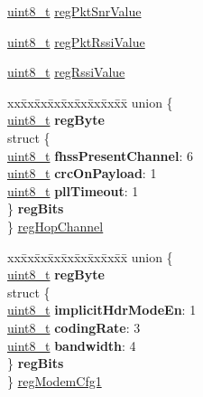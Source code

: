 \begin{DoxyCompactItemize}
\begin{tabbing}
\end{tabbing}\item 
\hyperlink{vl53l0x__types_8h_aba7bc1797add20fe3efdf37ced1182c5}{uint8\+\_\+t} \hyperlink{structFSK__Register__Map_a92cd6ce02538704e0e27d117099e4775}{reg\+Pkt\+Snr\+Value}
\item 
\hyperlink{vl53l0x__types_8h_aba7bc1797add20fe3efdf37ced1182c5}{uint8\+\_\+t} \hyperlink{structFSK__Register__Map_a019593bb7007a2b7d67e5565d565c5f8}{reg\+Pkt\+Rssi\+Value}
\item 
\hyperlink{vl53l0x__types_8h_aba7bc1797add20fe3efdf37ced1182c5}{uint8\+\_\+t} \hyperlink{structFSK__Register__Map_af6af2ecacf804bbab3b46c3f52a13b3f}{reg\+Rssi\+Value}
\item 
\begin{tabbing}
xx\=xx\=xx\=xx\=xx\=xx\=xx\=xx\=xx\=\kill
union \{\\
\>\hyperlink{vl53l0x__types_8h_aba7bc1797add20fe3efdf37ced1182c5}{uint8\_t} {\bfseries regByte}\\
\>struct \{\\
\>\>\hyperlink{vl53l0x__types_8h_aba7bc1797add20fe3efdf37ced1182c5}{uint8\_t} {\bfseries fhssPresentChannel}: 6\\
\>\>\hyperlink{vl53l0x__types_8h_aba7bc1797add20fe3efdf37ced1182c5}{uint8\_t} {\bfseries crcOnPayload}: 1\\
\>\>\hyperlink{vl53l0x__types_8h_aba7bc1797add20fe3efdf37ced1182c5}{uint8\_t} {\bfseries pllTimeout}: 1\\
\>\} {\bfseries regBits}\\
\} \hyperlink{structFSK__Register__Map_a881587e6b5cba28da6300ec6e1f9e9ee}{regHopChannel}\\

\end{tabbing}\item 
\begin{tabbing}
xx\=xx\=xx\=xx\=xx\=xx\=xx\=xx\=xx\=\kill
union \{\\
\>\hyperlink{vl53l0x__types_8h_aba7bc1797add20fe3efdf37ced1182c5}{uint8\_t} {\bfseries regByte}\\
\>struct \{\\
\>\>\hyperlink{vl53l0x__types_8h_aba7bc1797add20fe3efdf37ced1182c5}{uint8\_t} {\bfseries implicitHdrModeEn}: 1\\
\>\>\hyperlink{vl53l0x__types_8h_aba7bc1797add20fe3efdf37ced1182c5}{uint8\_t} {\bfseries codingRate}: 3\\
\>\>\hyperlink{vl53l0x__types_8h_aba7bc1797add20fe3efdf37ced1182c5}{uint8\_t} {\bfseries bandwidth}: 4\\
\>\} {\bfseries regBits}\\
\} \hyperlink{structFSK__Register__Map_a473a9661c49b5a2e0aab4ff816591a41}{regModemCfg1}\\


\end{tabbing}
\end{DoxyCompactItemize}
